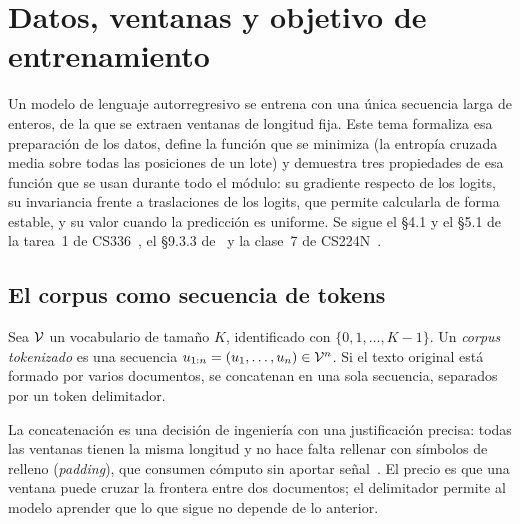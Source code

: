 \chapter{Datos, ventanas y objetivo de entrenamiento}
\label{tema:1}

Un modelo de lenguaje autorregresivo se entrena con una única secuencia larga de enteros, de la que se extraen ventanas de longitud fija. Este tema formaliza esa preparación de los datos, define la función que se minimiza (la entropía cruzada media sobre todas las posiciones de un lote) y demuestra tres propiedades de esa función que se usan durante todo el módulo: su gradiente respecto de los logits, su invariancia frente a traslaciones de los logits, que permite calcularla de forma estable, y su valor cuando la predicción es uniforme. Se sigue el §4.1 y el §5.1 de la tarea~1 de CS336~\cite{cs336}, el §9.3.3 de~\cite{d2l} y la clase~7 de CS224N~\cite{cs224n}.

\section{El corpus como secuencia de tokens}

\begin{definicion}\label{def:corpus}
Sea $\mathcal{V}$ un vocabulario de tamaño $K$, identificado con $\{0,1,\dots,K-1\}$. Un \emph{corpus tokenizado} es una secuencia $u_{1:n}=(u_1,\dots,u_n)\in\mathcal{V}^{n}$. Si el texto original está formado por varios documentos, se concatenan en una sola secuencia, separados por un token delimitador.
\end{definicion}

La concatenación es una decisión de ingeniería con una justificación precisa: todas las ventanas tienen la misma longitud y no hace falta rellenar con símbolos de relleno (\emph{padding}), que consumen cómputo sin aportar señal~\cite[§5.1]{cs336}. El precio es que una ventana puede cruzar la frontera entre dos documentos; el delimitador permite al modelo aprender que lo que sigue no depende de lo anterior.

